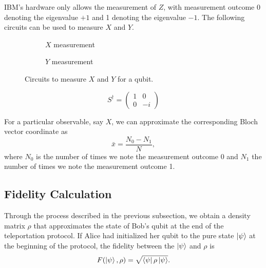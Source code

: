 \documentclass[prx,twocolumn]{revtex4-2}
\numberwithin{equation}{section}
\numberwithin{figure}{section}
\numberwithin{table}{section}
\begin{document}
IBM's hardware only allows the measurement of $Z$, with measurement outcome 0 denoting the eigenvalue $+1$ 
and 1 denoting the eigenvalue $-1$. The following circuits can be used to measure $X$ and $Y$.
\begin{figure}[h]
    \centering
    \begin{subfigure}[b]{0.4\columnwidth}
        \caption{$X$ measurement}
    \end{subfigure}
    \begin{subfigure}[b]{0.4\columnwidth}
        \caption{$Y$ measurement}
    \end{subfigure}
    \caption{Circuits to measure $X$ and $Y$ for a qubit.}
\end{figure}

\begin{equation}
    S^\dagger = \begin{pmatrix}
        1 & 0 \\ 
        0 & -i
    \end{pmatrix}
\end{equation}

For a particular observable, say $X$, we can approximate the corresponding Bloch vector coordinate as 
\begin{equation}
    \bar{x} = \frac{N_0 - N_1}{N},
\end{equation}
where $N_0$ is the number of times we note the measurement outcome 0 and $N_1$ the number of times we note 
the measurement outcome 1.

\subsection{Fidelity Calculation}
Through the process described in the previous subsection, we obtain a density matrix $\rho$ that approximates 
the state of Bob's qubit at the end of the teleportation protocol. If Alice had initialized her qubit to the 
pure state $\ket\psi$ at the beginning of the protocol, the fidelity between the $\ket\psi$ and $\rho$ is 
\cite{nielsen-chuang}
\begin{equation}
    F(\ket\psi, \rho) = \sqrt{\bra\psi \rho \ket\psi}.
    \label{eq:fidelity}
\end{equation}
\end{document}
